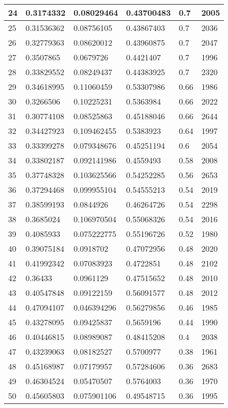 \begin{longtable}{|l|l|l|l|l|l|}
24 & 0.3174332 & 0.08029464 & 0.43700483 & 0.7 & 2005 \\ \hline 
25 & 0.31536362 & 0.08756105 & 0.43867403 & 0.7 & 2036 \\ \hline 
26 & 0.32779363 & 0.08620012 & 0.43960875 & 0.7 & 2047 \\ \hline 
27 & 0.3507865 & 0.0679726 & 0.4421407 & 0.7 & 1996 \\ \hline 
28 & 0.33829552 & 0.08249437 & 0.44383925 & 0.7 & 2320 \\ \hline 
29 & 0.34618995 & 0.11060459 & 0.53307986 & 0.66 & 1986 \\ \hline 
30 & 0.3266506 & 0.10225231 & 0.5363984 & 0.66 & 2022 \\ \hline 
31 & 0.30774108 & 0.08525863 & 0.45188046 & 0.66 & 2644 \\ \hline 
32 & 0.34427923 & 0.109462455 & 0.5383923 & 0.64 & 1997 \\ \hline 
33 & 0.33399278 & 0.079348676 & 0.45251194 & 0.6 & 2054 \\ \hline 
34 & 0.33802187 & 0.092141986 & 0.4559493 & 0.58 & 2008 \\ \hline 
35 & 0.37748328 & 0.103625566 & 0.54252285 & 0.56 & 2653 \\ \hline 
36 & 0.37294468 & 0.099955104 & 0.54555213 & 0.54 & 2019 \\ \hline 
37 & 0.38599193 & 0.0844926 & 0.46264726 & 0.54 & 2298 \\ \hline 
38 & 0.3685024 & 0.106970504 & 0.55068326 & 0.54 & 2016 \\ \hline 
39 & 0.4085933 & 0.075222775 & 0.55196726 & 0.52 & 1980 \\ \hline 
40 & 0.39075184 & 0.0918702 & 0.47072956 & 0.48 & 2020 \\ \hline 
41 & 0.41992342 & 0.07083923 & 0.4722851 & 0.48 & 2102 \\ \hline 
42 & 0.36433 & 0.0961129 & 0.47515652 & 0.48 & 2010 \\ \hline 
43 & 0.40547848 & 0.09122159 & 0.56091577 & 0.48 & 2012 \\ \hline 
44 & 0.47094107 & 0.046394296 & 0.56279856 & 0.46 & 1985 \\ \hline 
45 & 0.43278095 & 0.09425837 & 0.5659196 & 0.44 & 1990 \\ \hline 
46 & 0.40446815 & 0.08989087 & 0.48415208 & 0.4 & 2038 \\ \hline 
47 & 0.43239063 & 0.08182527 & 0.5700977 & 0.38 & 1961 \\ \hline 
48 & 0.45168987 & 0.07179957 & 0.57284606 & 0.36 & 2683 \\ \hline 
49 & 0.46304524 & 0.05470507 & 0.5764003 & 0.36 & 1970 \\ \hline 
50 & 0.45605803 & 0.075901106 & 0.49548715 & 0.36 & 1995 \\ \hline 
\end{longtable}